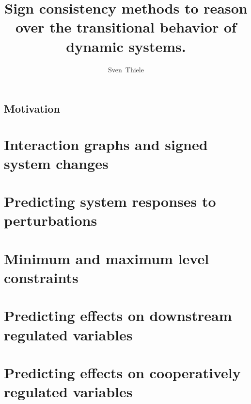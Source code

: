 \documentclass{llncs}
\begin{document}
\pagestyle{plain}

\title{Sign consistency methods to reason over the transitional behavior of dynamic systems.}
\author{
  Sven~Thiele
}
\maketitle

\section*{Motivation}


\tableofcontents

\nocite{sk06}
\nocite{saez2009}
\nocite{sthiele10b}
\nocite{sthiele11a}
\nocite{samaga13a}
\nocite{samaga13b}
\nocite{sthiele15}






\chapter*{Interaction graphs and signed system changes}

% 
% 

\chapter*{Predicting system responses to perturbations}


\chapter*{Minimum and maximum level constraints}


\chapter*{Predicting effects on downstream regulated variables}


\chapter*{Predicting effects on cooperatively regulated variables}

\end{document}
